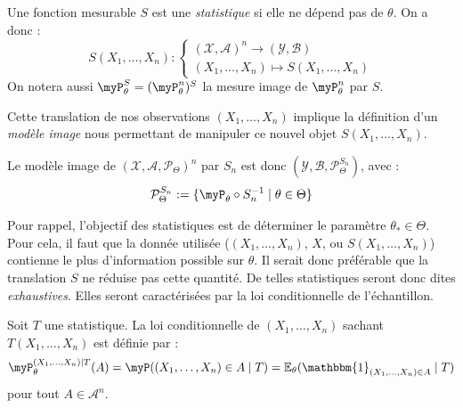 \begin{definition}[Statistique]
    Une fonction mesurable $S$ est une \emph{statistique} si elle ne dépend pas 
    de $ \theta$. On a donc : 
        $$ 
            S(X_1, \dots, X_n) : 
                \begin{cases}
                    ( \mathcal{X}, \mathcal{A})^n \longrightarrow ( \mathcal{Y}, \mathcal{B}) \\ 
                    (X_1, \dots, X_n) \longmapsto S(X_1, \dots, X_n)
                \end{cases}
        $$ 
    On notera aussi $ \myP_\theta^S = ( \myP_\theta^n)^S$ la mesure image de 
    $\myP_\theta^n$ par $S$. 
\end{definition}

Cette translation de nos observations $(X_1, \dots, X_n)$ implique la définition d'un \emph{modèle image} 
nous permettant de manipuler ce nouvel objet $S(X_1, \dots, X_n)$. 

\begin{definition}
    Le modèle image de $( \mathcal{X}, \mathcal{A}, \mathcal{P}_\Theta)^n$ par $S_n$ 
    est donc $ ( \mathcal{Y}, \mathcal{B}, \mathcal{P}_\Theta^{S_n})$, avec : 
        \begin{equation}
            \mathcal{P}_\Theta^{S_n} := \{ \myP_\theta \circ S_n^{-1} \mid \theta \in \Theta\}
        \end{equation}
\end{definition}

Pour rappel, l'objectif des statistiques est de déterminer le paramètre $ \theta_* \in \Theta$. 
Pour cela, il faut que la donnée utilisée ($(X_1, \dots, X_n)$, $X$, ou $S(X_1, \dots, X_n)$) contienne 
le plus d'information possible sur $ \theta$. 
Il serait donc préférable que la translation $S$ ne réduise pas cette quantité. De telles statistiques seront 
donc dites \emph{exhaustives}. Elles seront caractérisées par la loi conditionnelle de l'échantillon. 

\begin{definition}
    Soit $T$ une statistique. La loi conditionnelle de $(X_1, \dots, X_n)$ sachant 
    $T(X_1, \dots, X_n)$ est définie par : 
        \begin{equation}
            \myP_\theta^{(X_1, \dots, X_n) \mid T}(A) = \myP((X_1, \dots, X_n) \in A \mid T) 
            = \mathbb{E}_\theta( \mathbbm{1}_{(X_1, \dots, X_n) \in A} \mid T )
        \end{equation}
    pour tout $A \in \mathcal{A}^n$. 
\end{definition}

